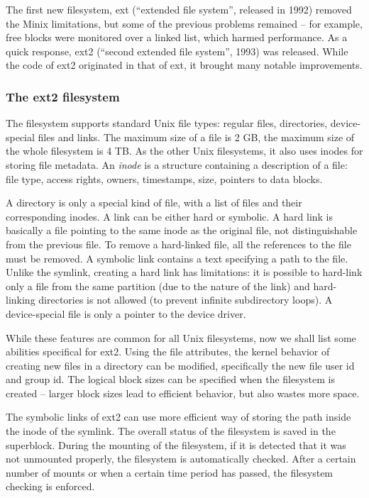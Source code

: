 \documentclass{acm_proc_article-sp}
\begin{document}
The first new filesystem, ext (``extended file system'', released in 1992) removed the Minix limitations, but some of the previous problems remained -- for example, free blocks were monitored over a linked list, which harmed performance. As a quick response, ext2 (``second extended file system'', 1993) was released. While the code of ext2 originated in that of ext, it brought many notable improvements.

\subsubsection{The ext2 filesystem}

The filesystem supports standard Unix file types: regular files, directories, device-special files and links. The maximum size of a file is 2 GB, the maximum size of the whole filesystem is 4 TB.
As the other Unix filesystems, it also uses inodes for storing file metadata. An {\it inode} is a structure containing a description of a file: file type, access rights, owners, timestamps, size, pointers to data blocks.

A directory is only a special kind of file, with a list of files and their corresponding inodes. A link can be either hard or symbolic. A hard link is basically a file pointing to the same inode as the original file, not distinguishable from the previous file. To remove a hard-linked file, all the references to the file must be removed. A symbolic link contains a text specifying a path to the file. Unlike the symlink, creating a hard link has limitations: it is possible to hard-link only a file from the same partition (due to the nature of the link) and hard-linking directories is not allowed (to prevent infinite subdirectory loops). A device-special file is only a pointer to the device driver.

While these features are common for all Unix filesystems, now we shall list some abilities specifical for ext2. Using the file attributes, the kernel behavior of creating new files in a directory can be modified, specifically the new file user id and group id. The logical block sizes can be specified when the filesystem is created -- larger block sizes lead to efficient behavior, but also wastes more space.

The symbolic links of ext2 can use more efficient way of storing the path inside the inode of the symlink. The overall status of the filesystem is saved in the superblock. During the mounting of the filesystem, if it is detected that it was not unmounted properly, the filesystem is automatically checked. After a certain number of mounts or when a certain time period has passed, the filesystem checking is enforced.
\end{document}
